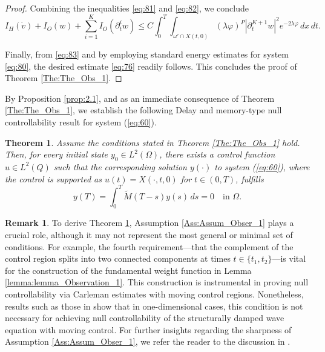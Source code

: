 \documentclass[12pt]{article}
\theoremstyle{plain}
\newtheorem{theorem}{Theorem}[section]
\theoremstyle{definition}
\newtheorem{remark}{Remark}[section]
\begin{document}
\begin{proof}
Combining the inequalities \eqref{eq:81} and \eqref{eq:82}, we conclude
\begin{equation}
\label{eq:83}
I_H(\dot{v}) + I_O(w) + \sum_{i=1}^K I_O(\partial_t^i w) \leq C \int_0^T \int_{\omega' \cap X(t,0)} (\lambda \varphi)^P |\partial_t^{K+1} w|^2 e^{-2\lambda \varphi} \, dx \, dt.
\end{equation}

Finally, from \eqref{eq:83} and by employing standard energy estimates for system \eqref{eq:80}, the desired estimate \eqref{eq:76} readily follows. This concludes the proof of Theorem \ref{The:The_Obs_1}.
\end{proof}









By Proposition \ref{prop:2.1}, and as an immediate consequence of Theorem \ref{The:The_Obs_1}, we establish the following Delay and memory-type null controllability result for system (\ref{eq:60}).

\begin{theorem}\label{the:the_obs_2}
Assume the conditions stated in Theorem \ref{The:The_Obs_1} hold. Then, for every initial state $y_0 \in L^2(\Omega)$, there exists a control function $u \in L^2(Q)$ such that the corresponding solution $y(\cdot)$ to system (\ref{eq:60}), where the control is supported as $u(t) = X(\cdot, t, 0)$ for $t \in (0, T)$, fulfills
\[
y(T) = \int_0^T \widetilde{M}(T - s) y(s) \, ds = 0 \quad \text{in } \Omega.
\]
\end{theorem}

\begin{remark}
To derive Theorem \ref{the:the_obs_2}, Assumption \ref{Ass:Assum_Obser_1} plays a crucial role, although it may not represent the most general or minimal set of conditions. For example, the fourth requirement—that the complement of the control region splits into two connected components at times $t \in \{t_1, t_2\}$—is vital for the construction of the fundamental weight function in Lemma \ref{lemma:lemma_Observation_1}. This construction is instrumental in proving null controllability via Carleman estimates with moving control regions. Nonetheless, results such as those in \cite{martin2013null} show that in one-dimensional cases, this condition is not necessary for achieving null controllability of the structurally damped wave equation with moving control. For further insights regarding the sharpness of Assumption \ref{Ass:Assum_Obser_1}, we refer the reader to the discussion in \cite{chaves2014null}.
\end{remark}
\end{document}
